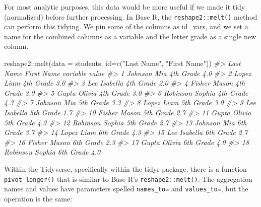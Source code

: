 \documentclass[
]{book}
\newenvironment{Shaded}{\begin{snugshade}}{\end{snugshade}}
\newcommand{\AttributeTok}[1]{\textcolor[rgb]{0.77,0.63,0.00}{#1}}
\newcommand{\CommentTok}[1]{\textcolor[rgb]{0.56,0.35,0.01}{\textit{#1}}}
\newcommand{\FunctionTok}[1]{\textcolor[rgb]{0.00,0.00,0.00}{#1}}
\newcommand{\NormalTok}[1]{#1}
\newcommand{\SpecialCharTok}[1]{\textcolor[rgb]{0.00,0.00,0.00}{#1}}
\newcommand{\StringTok}[1]{\textcolor[rgb]{0.31,0.60,0.02}{#1}}
\begin{document}
For most analytic purposes, this data would be more useful if we made it tidy (normalized) before further processing. In Base R, the \texttt{reshape2::melt()} method can perform this tidying. We pin some of the columns as id\_vars, and we set a name for the combined columns as a variable and the letter grade as a single new column.

\begin{Shaded}
\begin{Highlighting}[]
\NormalTok{reshape2}\SpecialCharTok{::}\FunctionTok{melt}\NormalTok{(}\AttributeTok{data =}\NormalTok{ students, }\AttributeTok{id=}\FunctionTok{c}\NormalTok{(}\StringTok{"Last Name"}\NormalTok{, }\StringTok{"First Name"}\NormalTok{))}
\CommentTok{\#\textgreater{}    Last Name First Name  variable value}
\CommentTok{\#\textgreater{} 1    Johnson        Mia 4th Grade   4.0}
\CommentTok{\#\textgreater{} 2      Lopez       Liam 4th Grade   3.0}
\CommentTok{\#\textgreater{} 3        Lee   Isabella 4th Grade   2.0}
\CommentTok{\#\textgreater{} 4     Fisher      Mason 4th Grade   3.0}
\CommentTok{\#\textgreater{} 5      Gupta     Olivia 4th Grade   3.0}
\CommentTok{\#\textgreater{} 6   Robinson     Sophia 4th Grade   4.3}
\CommentTok{\#\textgreater{} 7    Johnson        Mia 5th Grade   3.3}
\CommentTok{\#\textgreater{} 8      Lopez       Liam 5th Grade   3.0}
\CommentTok{\#\textgreater{} 9        Lee   Isabella 5th Grade   1.7}
\CommentTok{\#\textgreater{} 10    Fisher      Mason 5th Grade   2.7}
\CommentTok{\#\textgreater{} 11     Gupta     Olivia 5th Grade   4.3}
\CommentTok{\#\textgreater{} 12  Robinson     Sophia 5th Grade   2.7}
\CommentTok{\#\textgreater{} 13   Johnson        Mia 6th Grade   3.7}
\CommentTok{\#\textgreater{} 14     Lopez       Liam 6th Grade   4.3}
\CommentTok{\#\textgreater{} 15       Lee   Isabella 6th Grade   2.7}
\CommentTok{\#\textgreater{} 16    Fisher      Mason 6th Grade   2.3}
\CommentTok{\#\textgreater{} 17     Gupta     Olivia 6th Grade   4.0}
\CommentTok{\#\textgreater{} 18  Robinson     Sophia 6th Grade   4.0}
\end{Highlighting}
\end{Shaded}

Within the Tidyverse, specifically within the tidyr package, there is a function \texttt{pivot\_longer()} that is similar to Base R's \texttt{reshape2::melt()}. The aggregation names and values have parameters spelled \texttt{names\_to=} and \texttt{values\_to=}, but the operation is the same:
\end{document}
